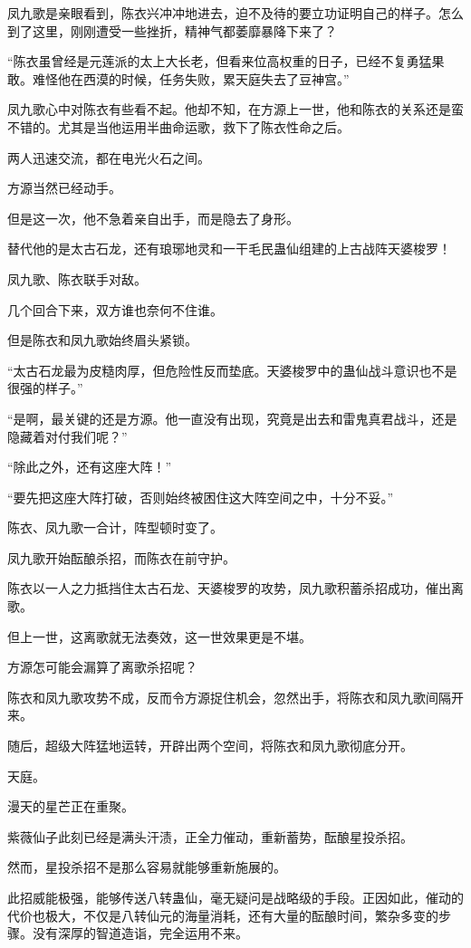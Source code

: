 \begin{this_body}
凤九歌是亲眼看到，陈衣兴冲冲地进去，迫不及待的要立功证明自己的样子。怎么到了这里，刚刚遭受一些挫折，精神气都萎靡暴降下来了？

“陈衣虽曾经是元莲派的太上大长老，但看来位高权重的日子，已经不复勇猛果敢。难怪他在西漠的时候，任务失败，累天庭失去了豆神宫。”

凤九歌心中对陈衣有些看不起。他却不知，在方源上一世，他和陈衣的关系还是蛮不错的。尤其是当他运用半曲命运歌，救下了陈衣性命之后。

两人迅速交流，都在电光火石之间。

方源当然已经动手。

但是这一次，他不急着亲自出手，而是隐去了身形。

替代他的是太古石龙，还有琅琊地灵和一干毛民蛊仙组建的上古战阵天婆梭罗！

凤九歌、陈衣联手对敌。

几个回合下来，双方谁也奈何不住谁。

但是陈衣和凤九歌始终眉头紧锁。

“太古石龙最为皮糙肉厚，但危险性反而垫底。天婆梭罗中的蛊仙战斗意识也不是很强的样子。”

“是啊，最关键的还是方源。他一直没有出现，究竟是出去和雷鬼真君战斗，还是隐藏着对付我们呢？”

“除此之外，还有这座大阵！”

“要先把这座大阵打破，否则始终被困住这大阵空间之中，十分不妥。”

陈衣、凤九歌一合计，阵型顿时变了。

凤九歌开始酝酿杀招，而陈衣在前守护。

陈衣以一人之力抵挡住太古石龙、天婆梭罗的攻势，凤九歌积蓄杀招成功，催出离歌。

但上一世，这离歌就无法奏效，这一世效果更是不堪。

方源怎可能会漏算了离歌杀招呢？

陈衣和凤九歌攻势不成，反而令方源捉住机会，忽然出手，将陈衣和凤九歌间隔开来。

随后，超级大阵猛地运转，开辟出两个空间，将陈衣和凤九歌彻底分开。

天庭。

漫天的星芒正在重聚。

紫薇仙子此刻已经是满头汗渍，正全力催动，重新蓄势，酝酿星投杀招。

然而，星投杀招不是那么容易就能够重新施展的。

此招威能极强，能够传送八转蛊仙，毫无疑问是战略级的手段。正因如此，催动的代价也极大，不仅是八转仙元的海量消耗，还有大量的酝酿时间，繁杂多变的步骤。没有深厚的智道造诣，完全运用不来。


\end{this_body}
